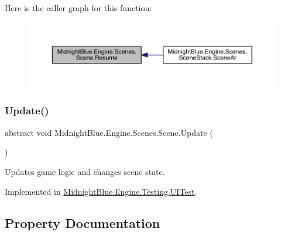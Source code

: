 Here is the caller graph for this function\+:
\nopagebreak
\begin{figure}[H]
\begin{center}
\leavevmode
\includegraphics[width=350pt]{class_midnight_blue_1_1_engine_1_1_scenes_1_1_scene_ab7cd837b20785116007a4732d90bc548_icgraph}
\end{center}
\end{figure}
\hypertarget{class_midnight_blue_1_1_engine_1_1_scenes_1_1_scene_a4e37ff3d5362a8ad5c0d82d7c990dfdf}{}\label{class_midnight_blue_1_1_engine_1_1_scenes_1_1_scene_a4e37ff3d5362a8ad5c0d82d7c990dfdf} 
\subsubsection{\texorpdfstring{Update()}{Update()}}
{\footnotesize\ttfamily abstract void Midnight\+Blue.\+Engine.\+Scenes.\+Scene.\+Update (\begin{DoxyParamCaption}{ }\end{DoxyParamCaption})\hspace{0.3cm}{\ttfamily [pure virtual]}}



Updates game logic and changes scene state. 



Implemented in \hyperlink{class_midnight_blue_1_1_engine_1_1_testing_1_1_u_i_test_a9866becb1e9b6bf9b9edb0f732b46250}{Midnight\+Blue.\+Engine.\+Testing.\+U\+I\+Test}.



\subsection{Property Documentation}
\hypertarget{class_midnight_blue_1_1_engine_1_1_scenes_1_1_scene_ad331b8ccde470e0a1b13b50e53e5fa58}{}\label{class_midnight_blue_1_1_engine_1_1_scenes_1_1_scene_ad331b8ccde470e0a1b13b50e53e5fa58} 
